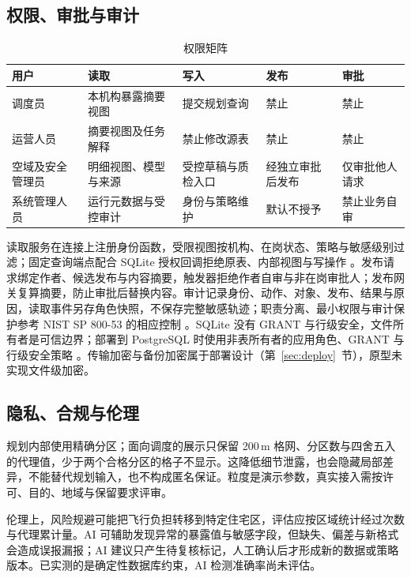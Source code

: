 \documentclass[a4paper,11pt,UTF8]{ctexart}
\begin{document}
\subsection{权限、审批与审计}

\begin{table}[!htbp]\centering\small
\caption{权限矩阵}
\begin{tabularx}{\textwidth}{L{2.4cm}YYL{2.3cm}L{2.1cm}}
\toprule
用户 & 读取 & 写入 & 发布 & 审批 \\
\midrule
调度员 & 本机构暴露摘要视图 & 提交规划查询 & 禁止 & 禁止 \\
运营人员 & 摘要视图及任务解释 & 禁止修改源表 & 禁止 & 禁止 \\
空域及安全管理员 & 明细视图、模型与来源 & 受控草稿与质检入口 & 经独立审批后发布 & 仅审批他人请求 \\
系统管理人员 & 运行元数据与受控审计 & 身份与策略维护 & 默认不授予 & 禁止业务自审 \\
\bottomrule
\end{tabularx}
\end{table}

读取服务在连接上注册身份函数，受限视图按机构、在岗状态、策略与敏感级别过滤；固定查询端点配合 SQLite 授权回调拒绝原表、内部视图与写操作 \cite{sqlite-auth}。发布请求绑定作者、候选发布与内容摘要，触发器拒绝作者自审与非在岗审批人；发布网关复算摘要，防止审批后替换内容。审计记录身份、动作、对象、发布、结果与原因，读取事件另存角色快照，不保存完整敏感轨迹；职责分离、最小权限与审计保护参考 NIST SP 800-53 的相应控制 \cite{nist}。SQLite 没有 GRANT 与行级安全，文件所有者是可信边界；部署到 PostgreSQL 时使用非表所有者的应用角色、GRANT 与行级安全策略 \cite{pg-rls}。传输加密与备份加密属于部署设计（第~\ref{sec:deploy}~节），原型未实现文件级加密。

\subsection{隐私、合规与伦理}

规划内部使用精确分区；面向调度的展示只保留 200\,m 格网、分区数与四舍五入的代理值，少于两个合格分区的格子不显示。这降低细节泄露，也会隐藏局部差异，不能替代规划输入，也不构成匿名保证。粒度是演示参数，真实接入需按许可、目的、地域与保留要求评审。

伦理上，风险规避可能把飞行负担转移到特定住宅区，评估应按区域统计经过次数与代理累计量。AI 可辅助发现异常的暴露值与敏感字段，但缺失、偏差与新格式会造成误报漏报；AI 建议只产生待复核标记，人工确认后才形成新的数据或策略版本。已实测的是确定性数据库约束，AI 检测准确率尚未评估。
\end{document}
